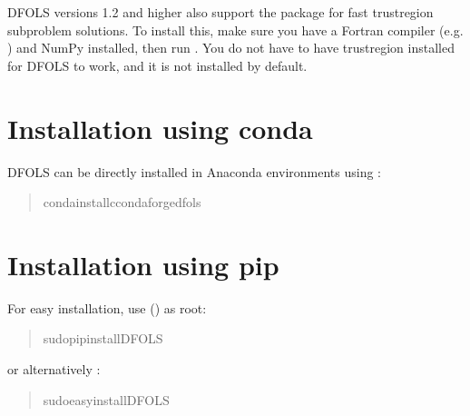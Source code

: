 \documentclass[letterpaper,10pt,english]{sphinxmanual}
\begin{document}
\sphinxAtStartPar
{} DFO\sphinxhyphen{}LS versions 1.2 and higher also support the  package for fast trust\sphinxhyphen{}region subproblem solutions. To install this, make sure you have a Fortran compiler (e.g. ) and NumPy installed, then run . You do not have to have trustregion installed for DFO\sphinxhyphen{}LS to work, and it is not installed by default.


\section{Installation using conda}
\label{\detokenize{install:installation-using-conda}}
\sphinxAtStartPar
DFO\sphinxhyphen{}LS can be directly installed in Anaconda environments using :
\begin{quote}

\begin{sphinxVerbatim}[commandchars=\\\{\}]
\PYGZdl{}condainstall\PYGZhy{}cconda\PYGZhy{}forgedfo\PYGZhy{}ls
\end{sphinxVerbatim}
\end{quote}


\section{Installation using pip}
\label{\detokenize{install:installation-using-pip}}
\sphinxAtStartPar
For easy installation, use  () as root:
\begin{quote}

\begin{sphinxVerbatim}[commandchars=\\\{\}]
\PYGZdl{}\PYG{o}{[}sudo\PYG{o}{]}pipinstallDFO\PYGZhy{}LS
\end{sphinxVerbatim}
\end{quote}

\sphinxAtStartPar
or alternatively :
\begin{quote}

\begin{sphinxVerbatim}[commandchars=\\\{\}]
\PYGZdl{}\PYG{o}{[}sudo\PYG{o}{]}easy\PYGZus{}installDFO\PYGZhy{}LS
\end{sphinxVerbatim}
\end{quote}
\end{document}
